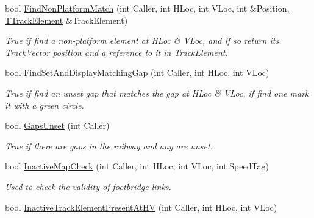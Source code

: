 \begin{DoxyCompactItemize}
\mbox{\label{class_t_track_ad55e3329a208e84e9e7519cc024b7aec}} 
bool \mbox{\hyperlink{class_t_track_ad55e3329a208e84e9e7519cc024b7aec}{Find\+Non\+Platform\+Match}} (int Caller, int H\+Loc, int V\+Loc, int \&Position, \mbox{\hyperlink{class_t_track_element}{T\+Track\+Element}} \&Track\+Element)
\begin{DoxyCompactList}\small\item\em True if find a non-\/platform element at H\+Loc \& V\+Loc, and if so return its Track\+Vector position and a reference to it in Track\+Element. \end{DoxyCompactList}\item 
\mbox{\label{class_t_track_a4109e356d902de07ebb8848acbee364a}} 
bool \mbox{\hyperlink{class_t_track_a4109e356d902de07ebb8848acbee364a}{Find\+Set\+And\+Display\+Matching\+Gap}} (int Caller, int H\+Loc, int V\+Loc)
\begin{DoxyCompactList}\small\item\em True if find an unset gap that matches the gap at H\+Loc \& V\+Loc, if find one mark it with a green circle. \end{DoxyCompactList}\item 
\mbox{\label{class_t_track_a794daa0471b473e28ff24c87a92112dc}} 
bool \mbox{\hyperlink{class_t_track_a794daa0471b473e28ff24c87a92112dc}{Gaps\+Unset}} (int Caller)
\begin{DoxyCompactList}\small\item\em True if there are gaps in the railway and any are unset. \end{DoxyCompactList}\item 
\mbox{\label{class_t_track_a23030c22d4c98706d1738205242646d9}} 
bool \mbox{\hyperlink{class_t_track_a23030c22d4c98706d1738205242646d9}{Inactive\+Map\+Check}} (int Caller, int H\+Loc, int V\+Loc, int Speed\+Tag)
\begin{DoxyCompactList}\small\item\em Used to check the validity of footbridge links. \end{DoxyCompactList}\item 
\mbox{\label{class_t_track_ae98d9466242e62a8892e073ebb44374e}} 
bool \mbox{\hyperlink{class_t_track_ae98d9466242e62a8892e073ebb44374e}{Inactive\+Track\+Element\+Present\+At\+HV}} (int Caller, int H\+Loc, int V\+Loc)

\end{DoxyCompactItemize}
